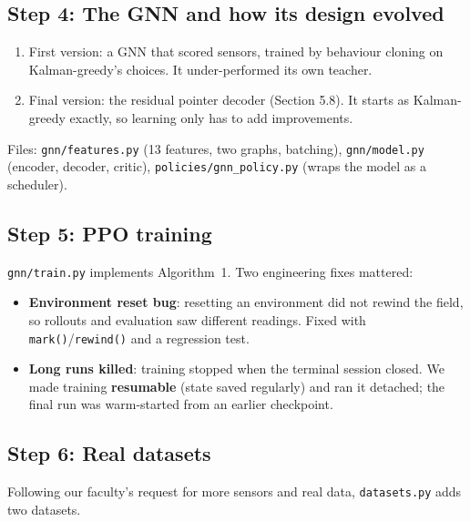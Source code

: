 \subsection{Step 4: The GNN and how its design evolved}
\begin{enumerate}
  \item First version: a GNN that scored sensors, trained by behaviour cloning on Kalman-greedy's choices. It
        under-performed its own teacher.
  \item Final version: the residual pointer decoder (Section 5.8). It starts as Kalman-greedy exactly, so learning only
        has to add improvements.
\end{enumerate}
Files: \texttt{gnn/features.py} (13 features, two graphs, batching), \texttt{gnn/model.py} (encoder, decoder, critic),
\texttt{policies/gnn\_policy.py} (wraps the model as a scheduler).

\subsection{Step 5: PPO training}
\texttt{gnn/train.py} implements Algorithm~1. Two engineering fixes mattered:
\begin{itemize}
  \item \textbf{Environment reset bug}: resetting an environment did not rewind the field, so rollouts and evaluation
        saw different readings. Fixed with \texttt{mark()}/\texttt{rewind()} and a regression test.
  \item \textbf{Long runs killed}: training stopped when the terminal session closed. We made training
        \textbf{resumable} (state saved regularly) and ran it detached; the final run was warm-started from an
        earlier checkpoint.
\end{itemize}

\subsection{Step 6: Real datasets}
Following our faculty's request for more sensors and real data, \texttt{datasets.py} adds two datasets.

